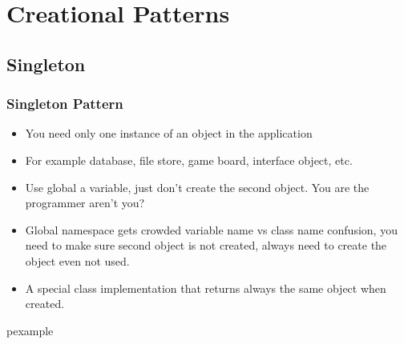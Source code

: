 \documentclass[trans,compress,xcolor=table]{beamer}
\begin{document}
\section{Creational Patterns}
\subsection{Singleton}
\begin{frame}
\frametitle{Singleton Pattern}
\begin{itemize}
\item {} You need only one instance of an object in the application
\item For example database, file store, game board, interface object, etc.
\item {} Use global a variable, just don't
create the second object. You are the programmer aren't you?
\item {} Global namespace gets 
crowded variable name vs class name confusion, you need to make
sure second object is not created, always need to create the object
even not used.
\item {} A special class implementation that
returns always the same object when created.
\end{itemize}
\end{frame}

\begin{frame}
\begin{beamercolorbox}{pexample}
\codesinga
\end{beamercolorbox}
\end{frame}
\end{document}
